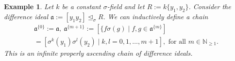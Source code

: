 \documentclass{article}
\def\NE{\mathbb{N}_{\geq1}}
\def\N{\mathbb{N}}
\def\a{\mathfrak{a}}
\def\s{\sigma}
\def\si{\unlhd_{\sigma}}
\def\fa{\text{ for all }}
\newenvironment{bew}{\begin{proof}[Proof]}{\end{proof}}
\theoremstyle{plain}
\newtheorem{ex}[Satz]{Example}
\theoremstyle{definition}
\begin{document}
\begin{ex}\label{nombasisex}
Let $k$ be a constant $\s$-field and let $R:= k\{y_1,y_2\}$. Consider the difference ideal $\a:= [y_1y_2] \si R$. We can inductively define a chain \begin{align*}\a^{\{0\}}:= \a,~ \a^{\{m+1\}}:= [\{ f \s(g) \mid f,g \in \a^{\{m\}}] \\ = [\s^k(y_1)\s^l(y_2) \mid k,l = 0,1,\ldots,m+1], \fa m \in \NE.\end{align*}
This is an infinite properly ascending chain of difference ideals. 



\end{ex}
\end{document}
